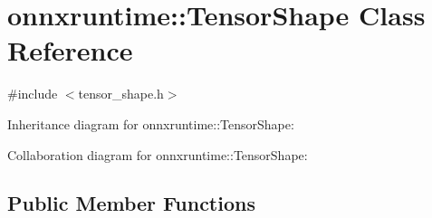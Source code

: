 \hypertarget{classonnxruntime_1_1TensorShape}{}\section{onnxruntime\+:\+:Tensor\+Shape Class Reference}
\label{classonnxruntime_1_1TensorShape}


{\ttfamily \#include $<$tensor\+\_\+shape.\+h$>$}



Inheritance diagram for onnxruntime\+:\+:Tensor\+Shape\+:


Collaboration diagram for onnxruntime\+:\+:Tensor\+Shape\+:
\subsection*{Public Member Functions}
